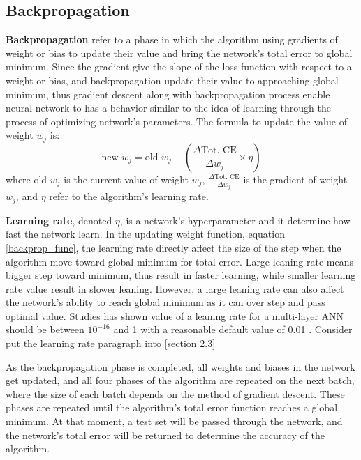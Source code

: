 \subsection{Backpropagation}
\textbf{Backpropagation} refer to a phase in which the algorithm using gradients of weight or bias to update their value and bring the network's total error to global minimum. Since the gradient give the slope of the loss function with respect to a weight or bias, and backpropagation update their value to approaching global minimum, thus gradient descent along with backpropagation process enable neural network to has a behavior similar to the idea of learning through the process of optimizing network's parameters. The formula to update the value of weight $w_j$ is:
%
\begin{equation} \label{backprop_func}
    \text{new } w_j = \text{old } w_j - \left( \frac{\Delta \text{Tot. CE}}{\Delta w_j} \times \eta \right)
\end{equation}
%
where old $w_j$ is the current value of weight $w_j$, $\frac{\Delta \text{Tot. CE}}{\Delta w_j}$ is the gradient of weight $w_j$, and $\eta$ refer to the algorithm's learning rate.

\textbf{Learning rate}, denoted $\eta$, is a network's hyperparameter and it determine how fast the network learn. In the updating weight function, equation \ref{backprop_func}, the learning rate directly affect the size of the step when the algorithm move toward global minimum for total error. Large leaning rate means bigger step toward minimum, thus result in faster learning, while smaller learning rate value result in slower leaning. However, a large leaning rate can also affect the network's ability to reach global minimum as it can over step and pass optimal value. Studies has shown value of a leaning rate for a multi-layer ANN should be between $10^{-16}$ and 1 with a reasonable default value of 0.01 \cite{bengio2012practical}. {\color{red} Consider put the learning rate paragraph into [section 2.3]}

As the backpropagation phase is completed, all weights and biases in the network get updated, and all four phases of the algorithm are repeated on the next batch, where the size of each batch depends on the method of gradient descent. These phases are repeated until the algorithm's total error function reaches a global minimum. At that moment, a test set will be passed through the network, and the network's total error will be returned to determine the accuracy of the algorithm.
